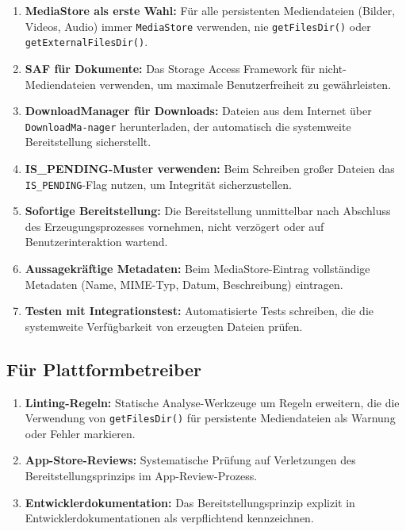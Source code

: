 ﻿\documentclass[12pt, a4paper]{article}
\begin{document}
\begin{enumerate}[label=\textbf{E\arabic*.}]
  \item \textbf{MediaStore als erste Wahl:} Für alle persistenten Mediendateien
    (Bilder, Videos, Audio) immer \texttt{MediaStore} verwenden, nie
    \texttt{getFilesDir()} oder \texttt{getExternalFiles\newline Dir()}.
  \item \textbf{SAF für Dokumente:} Das Storage Access Framework für
    nicht-Mediendateien verwenden, um maximale Benutzerfreiheit zu gewährleisten.
  \item \textbf{DownloadManager für Downloads:} Dateien aus dem Internet über
    \texttt{DownloadMa-\newline nager} herunterladen, der automatisch die systemweite
    Bereitstellung sicherstellt.
  \item \textbf{IS\_PENDING-Muster verwenden:} Beim Schreiben großer Dateien
    das \texttt{IS\_PEN\newline DING}-Flag nutzen, um Integrität sicherzustellen.
  \item \textbf{Sofortige Bereitstellung:} Die Bereitstellung unmittelbar nach
    Abschluss des Erzeugungsprozesses vornehmen, nicht verzögert oder auf
    Benutzerinteraktion wartend.
  \item \textbf{Aussagekräftige Metadaten:} Beim MediaStore-Eintrag vollständige
    Metadaten (Name, MIME-Typ, Datum, Beschreibung) eintragen.
  \item \textbf{Testen mit Integrationstest:} Automatisierte Tests schreiben,
    die die systemweite Verfügbarkeit von erzeugten Dateien prüfen.
\end{enumerate}

\subsection{Für Plattformbetreiber}

\begin{enumerate}[label=\textbf{P\arabic*.}]
  \item \textbf{Linting-Regeln:} Statische Analyse-Werkzeuge um Regeln erweitern,
    die die Verwendung von \texttt{getFilesDir()} für persistente Mediendateien
    als Warnung oder Fehler markieren.
  \item \textbf{App-Store-Reviews:} Systematische Prüfung auf Verletzungen des
    Bereitstellungsprinzips im App-Review-Prozess.
  \item \textbf{Entwicklerdokumentation:} Das Bereitstellungsprinzip explizit in
    Entwicklerdokumentationen als verpflichtend kennzeichnen.
\end{enumerate}
\end{document}
